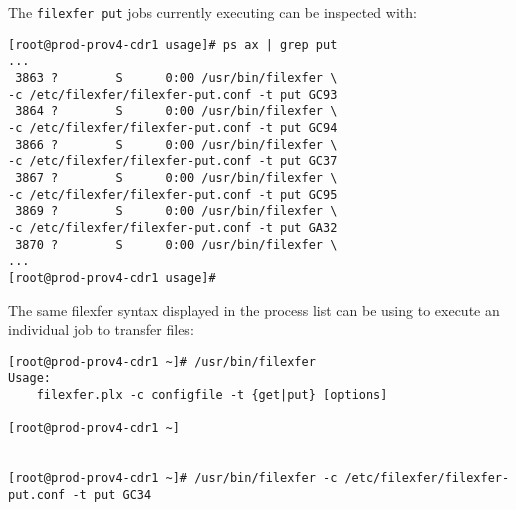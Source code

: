 \noindent The \texttt{filexfer put} jobs currently executing can be
inspected with:

\begin{verbatim}
[root@prod-prov4-cdr1 usage]# ps ax | grep put
...
 3863 ?        S      0:00 /usr/bin/filexfer \
-c /etc/filexfer/filexfer-put.conf -t put GC93
 3864 ?        S      0:00 /usr/bin/filexfer \
-c /etc/filexfer/filexfer-put.conf -t put GC94
 3866 ?        S      0:00 /usr/bin/filexfer \
-c /etc/filexfer/filexfer-put.conf -t put GC37
 3867 ?        S      0:00 /usr/bin/filexfer \
-c /etc/filexfer/filexfer-put.conf -t put GC95
 3869 ?        S      0:00 /usr/bin/filexfer \
-c /etc/filexfer/filexfer-put.conf -t put GA32
 3870 ?        S      0:00 /usr/bin/filexfer \
...
[root@prod-prov4-cdr1 usage]#
\end{verbatim}

\newpage
\noindent The same filexfer syntax displayed in the process list
can be using to execute an individual job to transfer files:

\begin{verbatim}
[root@prod-prov4-cdr1 ~]# /usr/bin/filexfer
Usage:
    filexfer.plx -c configfile -t {get|put} [options]

[root@prod-prov4-cdr1 ~]


[root@prod-prov4-cdr1 ~]# /usr/bin/filexfer -c /etc/filexfer/filexfer-put.conf -t put GC34
\end{verbatim}
